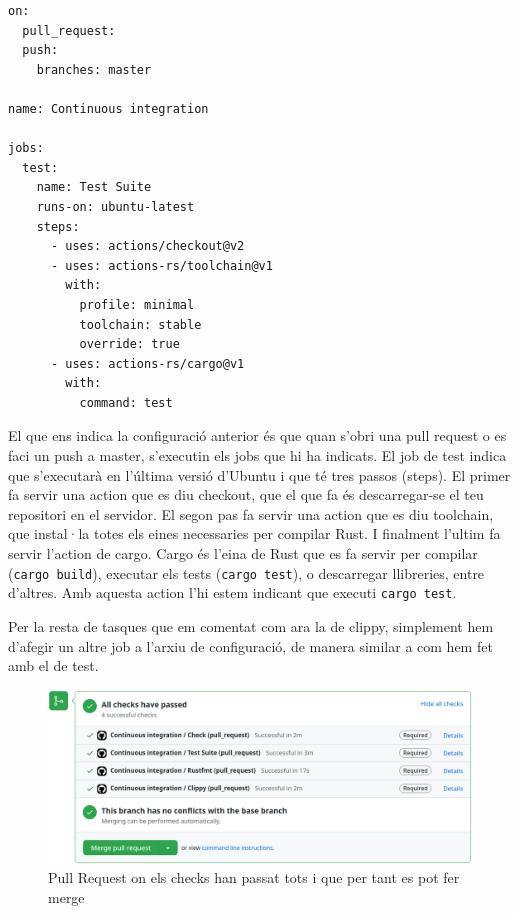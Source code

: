 ﻿\documentclass{article}
\begin{document}
\begin{verbatim}
on:
  pull_request:
  push:
    branches: master

name: Continuous integration

jobs:
  test:
    name: Test Suite
    runs-on: ubuntu-latest
    steps:
      - uses: actions/checkout@v2
      - uses: actions-rs/toolchain@v1
        with:
          profile: minimal
          toolchain: stable
          override: true
      - uses: actions-rs/cargo@v1
        with:
          command: test
\end{verbatim}

El que ens indica la configuració anterior és que quan s'obri una pull request o
es faci un push a master, s'executin els jobs que hi ha indicats. El job de test
indica que s'executarà en l'última versió d'Ubuntu i que té tres passos (steps).
El primer fa servir una action que es diu checkout, que el que fa és
descarregar-se el teu repositori en el servidor. El segon pas fa servir una
action que es diu toolchain, que instal·la totes els eines necessaries per
compilar Rust. I finalment l'ultim fa servir l'action de cargo. Cargo és l'eina
de Rust que es fa servir per compilar (\texttt{cargo build}), executar els tests
(\texttt{cargo test}), o descarregar llibreries, entre d'altres. Amb aquesta
action l'hi estem indicant que executi \texttt{cargo test}.

Per la resta de tasques que em comentat com ara la de clippy, simplement hem 
d'afegir un altre job a l'arxiu de configuració, de manera similar a com hem 
fet amb el de test.

\begin{figure}[!htb]
    \includegraphics[width=\linewidth]{ci-pr-success.png}
    \centering
    \captionsetup{justification=centering}
    \caption{Pull Request on els checks han passat tots i que per tant es pot fer merge}
\end{figure}
\end{document}
